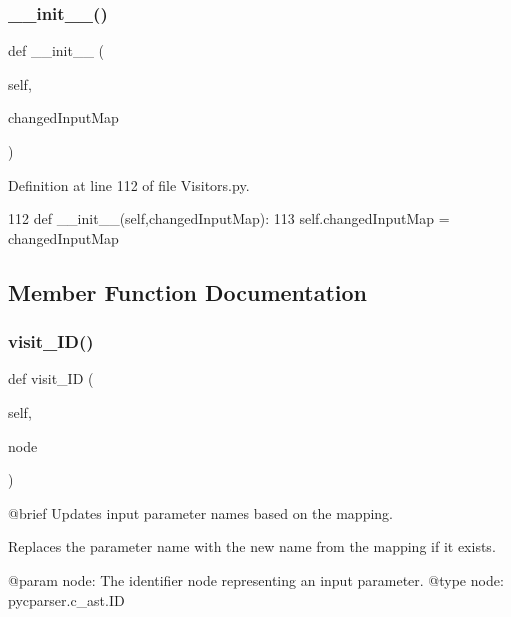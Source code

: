 \subsubsection{\texorpdfstring{\+\_\+\+\_\+init\+\_\+\+\_\+()}{\_\_init\_\_()}}
{\footnotesize\ttfamily def \+\_\+\+\_\+init\+\_\+\+\_\+ (\begin{DoxyParamCaption}\item[{}]{self,  }\item[{}]{changed\+Input\+Map }\end{DoxyParamCaption})}



Definition at line 112 of file Visitors.\+py.


\begin{DoxyCode}
112     \textcolor{keyword}{def }\_\_init\_\_(self,changedInputMap):
113         self.changedInputMap = changedInputMap
\end{DoxyCode}


\subsection{Member Function Documentation}
\mbox{\label{classVisitors_1_1InputParamModifier_a876b22ca4502c2197e9881ebf8fb6288}} 
\subsubsection{\texorpdfstring{visit\+\_\+\+I\+D()}{visit\_ID()}}
{\footnotesize\ttfamily def visit\+\_\+\+ID (\begin{DoxyParamCaption}\item[{}]{self,  }\item[{}]{node }\end{DoxyParamCaption})}

\begin{DoxyVerb}@brief Updates input parameter names based on the mapping.

Replaces the parameter name with the new name from the mapping if it exists.

@param node: The identifier node representing an input parameter.
@type node: pycparser.c_ast.ID
\end{DoxyVerb}
 

